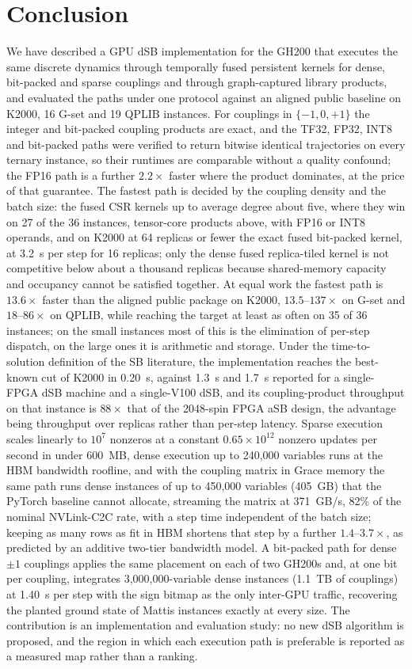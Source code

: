 \documentclass[11pt,a4paper]{article}
\begin{document}
\section{Conclusion}\label{sec:conclusion}
We have described a GPU dSB implementation for the GH200 that executes the same discrete dynamics through temporally fused persistent kernels for dense, bit-packed and sparse couplings and through graph-captured library products, and evaluated the paths under one protocol against an aligned public baseline on K2000, 16 G-set and 19 QPLIB instances. For couplings in $\{-1,0,+1\}$ the integer and bit-packed coupling products are exact, and the TF32, FP32, INT8 and bit-packed paths were verified to return bitwise identical trajectories on every ternary instance, so their runtimes are comparable without a quality confound; the FP16 path is a further $2.2\times$ faster where the product dominates, at the price of that guarantee. The fastest path is decided by the coupling density and the batch size: the fused CSR kernels up to average degree about five, where they win on 27 of the 36 instances, tensor-core products above, with FP16 or INT8 operands, and on K2000 at 64 replicas or fewer the exact fused bit-packed kernel, at 3.2~\textmu s per step for 16 replicas; only the dense fused replica-tiled kernel is not competitive below about a thousand replicas because shared-memory capacity and occupancy cannot be satisfied together. At equal work the fastest path is $13.6\times$ faster than the aligned public package on K2000, $13.5$--$137\times$ on G-set and $18$--$86\times$ on QPLIB, while reaching the target at least as often on 35 of 36 instances; on the small instances most of this is the elimination of per-step dispatch, on the large ones it is arithmetic and storage. Under the time-to-solution definition of the SB literature, the implementation reaches the best-known cut of K2000 in 0.20~s, against 1.3~s and 1.7~s reported for a single-FPGA dSB machine and a single-V100 dSB, and its coupling-product throughput on that instance is $88\times$ that of the 2048-spin FPGA aSB design, the advantage being throughput over replicas rather than per-step latency. Sparse execution scales linearly to $10^7$ nonzeros at a constant $0.65\times10^{12}$ nonzero updates per second in under 600~MB, dense execution up to 240,000 variables runs at the HBM bandwidth roofline, and with the coupling matrix in Grace memory the same path runs dense instances of up to 450,000 variables (405~GB) that the PyTorch baseline cannot allocate, streaming the matrix at 371~GB/s, 82\% of the nominal NVLink-C2C rate, with a step time independent of the batch size; keeping as many rows as fit in HBM shortens that step by a further $1.4$--$3.7\times$, as predicted by an additive two-tier bandwidth model. A bit-packed path for dense $\pm1$ couplings applies the same placement on each of two GH200s and, at one bit per coupling, integrates 3,000,000-variable dense instances (1.1~TB of couplings) at 1.40~s per step with the sign bitmap as the only inter-GPU traffic, recovering the planted ground state of Mattis instances exactly at every size. The contribution is an implementation and evaluation study: no new dSB algorithm is proposed, and the region in which each execution path is preferable is reported as a measured map rather than a ranking.
\end{document}
